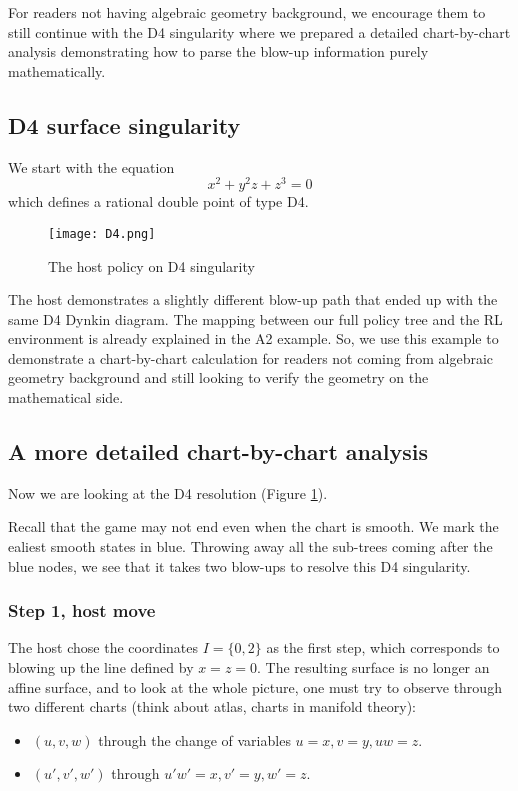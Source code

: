 \documentclass{article}
\theoremstyle{plain}
\theoremstyle{definition}
\theoremstyle{remark}
\begin{document}
For readers not having algebraic geometry background, we encourage them to still continue with the D4 singularity where we prepared a detailed chart-by-chart analysis demonstrating how to parse the blow-up information purely mathematically.

\subsection{D4 surface singularity}
We start with the equation
\[ x^2 + y^2z + z^3 = 0\]
which defines a rational double point of type D4.

\begin{figure}[ht!]
\centering
\texttt{[image: D4.png]}
\caption{The host policy on D4 singularity} \label{d4}
\end{figure}

The host demonstrates a slightly different blow-up path that ended up with the same D4 Dynkin diagram. The mapping between our full policy tree and the RL environment is already explained in the A2 example. So, we use this example to demonstrate a chart-by-chart calculation for readers not coming from algebraic geometry background and still looking to verify the geometry on the mathematical side.

\subsection{A more detailed chart-by-chart analysis}\label{detailed}
Now we are looking at the D4 resolution (Figure \ref{d4}).

Recall that the game may not end even when the chart is smooth. We mark the ealiest smooth states in blue. Throwing away all the sub-trees coming after the blue nodes, we see that it takes two blow-ups to resolve this D4 singularity.

\subsubsection{Step 1, host move}
The host chose the coordinates $I = \{0, 2\}$ as the first step, which corresponds to blowing up the line defined by $x=z=0$. The resulting surface is no longer an affine surface, and to look at the whole picture, one must try to observe through two different charts (think about atlas, charts in manifold theory):
\begin{itemize}
\item $(u,v,w)$ through the change of variables $u=x, v=y, uw=z$.
\item $(u',v',w')$ through $u'w'=x, v'=y, w'=z$.
\end{itemize}
 
\end{document}
